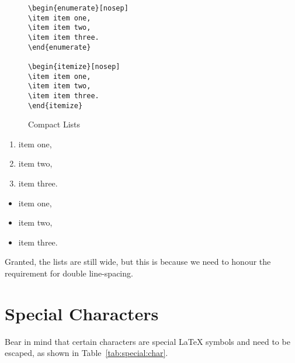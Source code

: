 \begin{figure}[htb!]
\begin{lstlisting}
\begin{enumerate}[nosep]
\item item one,
\item item two,
\item item three.
\end{enumerate}

\begin{itemize}[nosep]
\item item one,
\item item two,
\item item three.
\end{itemize}
\end{lstlisting}
\caption{Compact Lists}\label{fig:enumitem}
\end{figure}


\begin{enumerate}[nosep]
\item item one,
\item item two,
\item item three.
\end{enumerate}

\begin{itemize}[nosep]
\item item one,
\item item two,
\item item three.
\end{itemize}

Granted, the lists are still wide, but this is because we need to honour the requirement for double line-spacing. 

\section{Special Characters}

Bear in mind that certain characters are special \LaTeX{} symbols and need to be escaped, as shown in Table~\ref{tab:special:char}.

